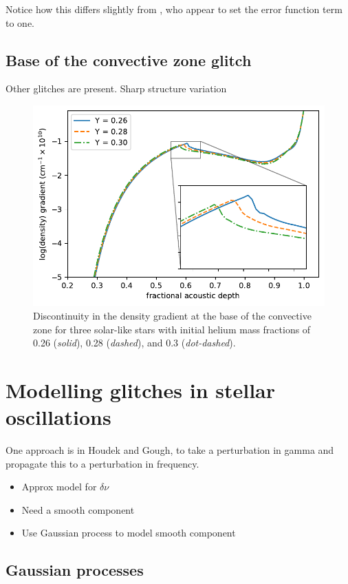 Notice how this differs slightly from \citet{Houdek.Gough2007}, who appear to set the error function term to one.

\subsection{Base of the convective zone glitch}\label{sec:bcz-glitch}

Other glitches are present. Sharp structure variation

\begin{figure}
    \centering
    \includegraphics{figures/bcz-density-gradient.pdf}
    \caption{Discontinuity in the density gradient at the base of the convective zone for three solar-like stars with initial helium mass fractions of 0.26 (\emph{solid}), 0.28 (\emph{dashed}), and 0.3 (\emph{dot-dashed}).}
    \label{fig:bcz-density}
\end{figure}

\section[Modelling the glitch]{Modelling glitches in stellar oscillations}

One approach is in Houdek and Gough, to take a perturbation in gamma and propagate this to a perturbation in frequency.

\begin{itemize}
    \item Approx model for \(\delta\nu\)
    \item Need a smooth component
    \item Use Gaussian process to model smooth component
\end{itemize}

\subsection{Gaussian processes }\label{sec:glitch-gp}

